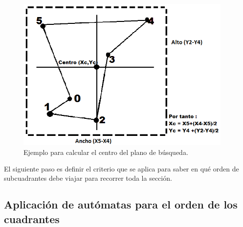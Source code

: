  \begin{figure}[hbtp]
    \centering
        \includegraphics[width=0.95\textwidth]{MetodoRectanguloAureo/Imagenes/rectangulo.png}
        \caption{Ejemplo para calcular el centro del plano de búsqueda.}
        \label{fig:rectangulo}
\end{figure}

% 

\hspace*{1cm} El siguiente paso es definir el criterio que se aplica para saber en qué orden de subcuadrantes debe viajar para recorrer toda la sección.

\subsection{Aplicación de autómatas para el orden de los cuadrantes} 

